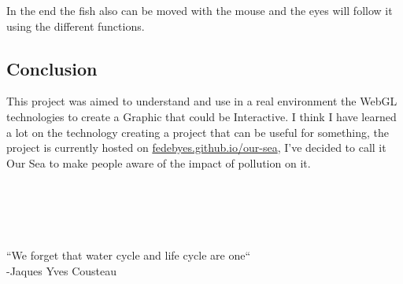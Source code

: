 \documentclass[a4paper,10pt]{article}
\begin{document}
In the end the fish also can be moved with the mouse and the eyes will follow it using the different functions.



\subsection{Conclusion}

This project was aimed to understand and use in a real environment the WebGL technologies to create a Graphic that could be Interactive.
I think I have learned a lot on the technology creating a project that can be useful for something, the project is currently hosted on  \href{https://fedebyes.github.io/our-sea/}{fedebyes.github.io/our-sea}, I've decided to call it Our Sea to make people aware of the impact of pollution on it. 
\\
\\
\\
\\
\\
\\
{\center \Huge``We forget that water cycle and life cycle are one``\\
\hspace*{\fill}-Jaques Yves Cousteau}
\end{document}
